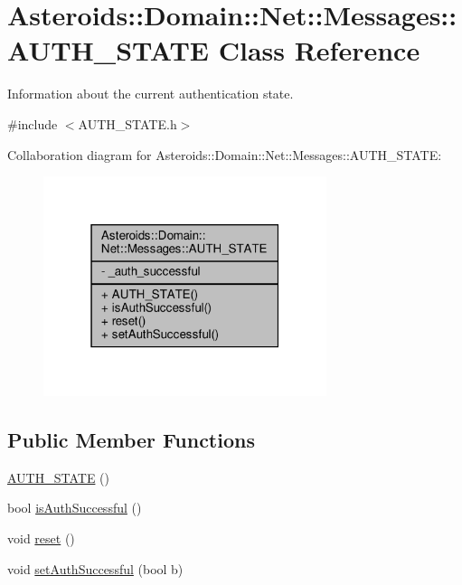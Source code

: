 \hypertarget{classAsteroids_1_1Domain_1_1Net_1_1Messages_1_1AUTH__STATE}{}\section{Asteroids\+:\+:Domain\+:\+:Net\+:\+:Messages\+:\+:A\+U\+T\+H\+\_\+\+S\+T\+A\+TE Class Reference}
\label{classAsteroids_1_1Domain_1_1Net_1_1Messages_1_1AUTH__STATE}


Information about the current authentication state.  




{\ttfamily \#include $<$A\+U\+T\+H\+\_\+\+S\+T\+A\+T\+E.\+h$>$}



Collaboration diagram for Asteroids\+:\+:Domain\+:\+:Net\+:\+:Messages\+:\+:A\+U\+T\+H\+\_\+\+S\+T\+A\+TE\+:\nopagebreak
\begin{figure}[H]
\begin{center}
\leavevmode
\includegraphics[width=235pt]{classAsteroids_1_1Domain_1_1Net_1_1Messages_1_1AUTH__STATE__coll__graph}
\end{center}
\end{figure}
\subsection*{Public Member Functions}
\begin{DoxyCompactItemize}
\item 
\hyperlink{classAsteroids_1_1Domain_1_1Net_1_1Messages_1_1AUTH__STATE_a6d14693ee76c4fc9940ab2d85a24af5f}{A\+U\+T\+H\+\_\+\+S\+T\+A\+TE} ()
\item 
bool \hyperlink{classAsteroids_1_1Domain_1_1Net_1_1Messages_1_1AUTH__STATE_aeff14792e906f69aa717d94c552cf075}{is\+Auth\+Successful} ()
\item 
void \hyperlink{classAsteroids_1_1Domain_1_1Net_1_1Messages_1_1AUTH__STATE_a87117d1188c07bea42ec44ed45125044}{reset} ()
\item 
void \hyperlink{classAsteroids_1_1Domain_1_1Net_1_1Messages_1_1AUTH__STATE_a7f307b3e98dee115df05cc6d574ed2d0}{set\+Auth\+Successful} (bool b)
\end{DoxyCompactItemize}
